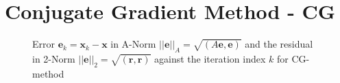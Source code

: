 \documentclass[11pt,a4paper]{article}
\begin{document}
\section{Conjugate Gradient Method - CG}
\label{chapter:CG}

\begin{figure}[!htbp]
	\hspace*{0.8cm}
	\leavevmode
	\resizebox{1.0\width}{!}{}
	\caption{Error $\mathbf{e}_k = \mathbf{x}_k - \mathbf{x} $ in A-Norm $||\mathbf{e}||_A = \sqrt{(A\mathbf{e}, \mathbf{e})}$ and the residual in 2-Norm $||\mathbf{e}||_2 = \sqrt{(\mathbf{r}, \mathbf{r})}$ against the iteration index $k$ for CG-method}
	\label{fig::CGNorms}
\end{figure}
\end{document}
